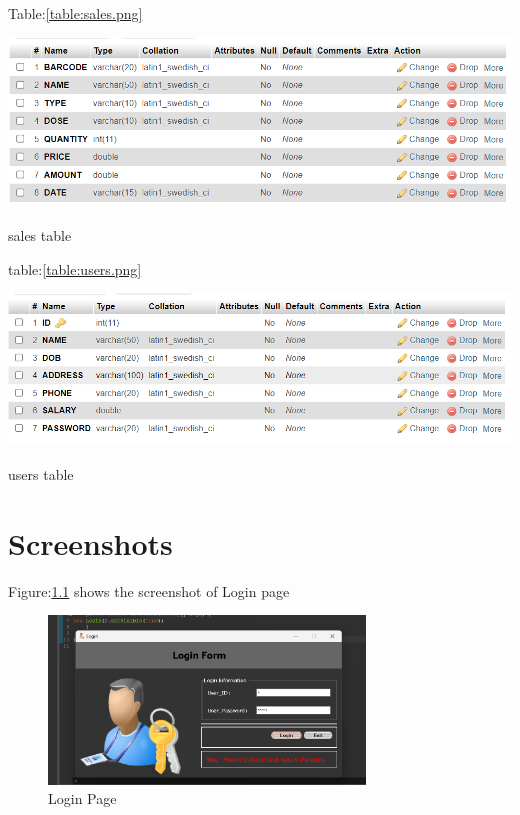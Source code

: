 \documentclass[12pt, letter paper]{report}
\begin{document}
\begin{center}
	Table:\ref{table:sales.png}
	\begin{table}[h]
		\centering
		\includegraphics[width=1\textwidth]{sales.png}
		\caption{sales table}
		\label{table:sales.png}
	\end{table}
\end{center}
\newpage
\begin{center}
	table:\ref{table:users.png}
	\begin{table}[h]
		\centering
		\includegraphics[width=1\textwidth]{users.png}
		\caption{users table}
		\label{table:users.png}
	\end{table}
\end{center}


\chapter{Screenshots}

Figure:\ref{fig:home page.png} shows the screenshot of Login page 
\begin{figure}[h]
 \centering
 \includegraphics[width=0.75\textwidth]{home page.png}
 \caption{Login Page}
 \label{fig:home page.png}
\end{figure}
\end{document}
